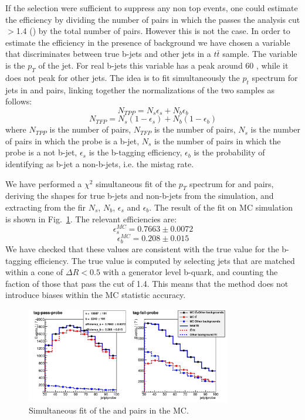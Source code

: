 If the \tg{} selection were sufficient to suppress any non top events, one could estimate the efficiency by dividing the number of \tp{} pairs in which the \probe{} passes the analysis cut \jpb$>$1.4 (\tpp) by the total number of \tp{} pairs. However this is not the case. 
In order to estimate the efficiency in the presence of background we have chosen a variable that discriminates between true b-jets and other jets in a $t\bar{t}$ sample. The variable is the $p_{T}$ of the \probe{} jet. For real b-jets this variable has a peak around 60 \GeV, while it does not peak for other jets. The idea is to fit simultaneously the $p_{t}$ spectrum for \probe{} jets in \tpp{} and \tfp{} pairs, linking together the normalizations of the two samples as follows:
\begin{equation}
N_{TPP}=N_{s}\epsilon_{s} + N_b\epsilon_{b}
\end{equation}
\begin{equation}
N_{TFP}=N_{s}(1-\epsilon_{s}) + N_b(1-\epsilon_{b})
\end{equation}
where $N_{TPP}$ is the number of \tpp{} pairs, $N_{TFP}$ is the number of \tfp{} pairs, $N_{s}$ is the number of \tp{} pairs in which the probe is a b-jet, $N_{s}$ is the number of \tp{} pairs in which the probe is a not b-jet, $\epsilon_{s}$ is the b-tagging efficiency, $\epsilon_{b}$ is the probability of identifying as b-jet a non-b-jets, i.e. the mistag rate. 

We have performed a $\chi^{2}$ simultaneous fit of the \probe{} $p_{T}$ spectrum for \tpp{} and \tfp{} pairs, deriving the shapes for true b-jets and non-b-jets from the simulation, and extracting from the fir $N_{s}$, $N_b$, $\epsilon_{s}$ and $\epsilon_{b}$.
The result of the fit on MC simulation is shown in Fig.~\ref{fig:mc_tp}. The relevant efficiencies are:
\begin{equation}
\epsilon_{s}^{MC}=0.7663\pm0.0072
\end{equation}
\begin{equation}
\epsilon_{b}^{MC}=0.208\pm0.015
\end{equation}
We have checked that these values are consistent with the true value for the b-tagging efficiency. The true value is computed by selecting jets that are matched within a cone of $\Delta{R}<0.5$ with a generator level b-quark, and counting the faction of those that pass the \jpb cut of 1.4. This means that the \tp{} method does not introduce biases within the MC statistic accuracy.

\begin{figure}[b]
\centering
\includegraphics[width=0.8\textwidth]{images/mc_pt_probe.pdf}
\caption{Simultaneous fit of the \tpp{} and \tfp{} pairs in the MC.\label{fig:mc_tp}}
\end{figure}

